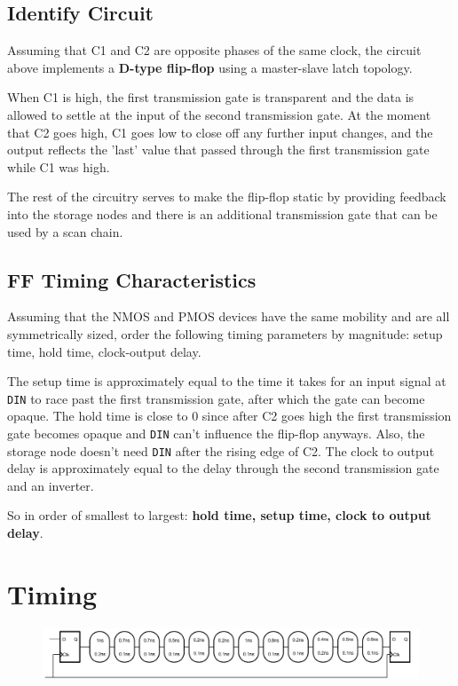\documentclass[11pt]{article}
\begin{document}
\subsection{Identify Circuit}

Assuming that C1 and C2 are opposite phases of the same clock, the circuit above implements a \textbf{D-type flip-flop} using a master-slave latch topology.

When C1 is high, the first transmission gate is transparent and the data is allowed to settle at the input of the second transmission gate. At the moment that C2 goes high, C1 goes low to close off any further input changes, and the output reflects the 'last' value that passed through the first transmission gate while C1 was high.

The rest of the circuitry serves to make the flip-flop static by providing feedback into the storage nodes and there is an additional transmission gate that can be used by a scan chain.

\subsection{FF Timing Characteristics}
Assuming that the NMOS and PMOS devices have the same mobility and are all symmetrically sized, order the following timing parameters by magnitude: setup time, hold time, clock-output delay.

The setup time is approximately equal to the time it takes for an input signal at \verb|DIN| to race past the first transmission gate, after which the gate can become opaque. The hold time is close to 0 since after C2 goes high the first transmission gate becomes opaque and \verb|DIN| can't influence the flip-flop anyways. Also, the storage node doesn't need \verb|DIN| after the rising edge of C2. The clock to output delay is approximately equal to the delay through the second transmission gate and an inverter.

So in order of smallest to largest: \textbf{hold time, setup time, clock to output delay}.

\section{Timing}
\begin{figure}[H]
	\centerline{\includegraphics[width=\textwidth+4cm]{problem3_timing_path.png}}
\end{figure}
\end{document}
